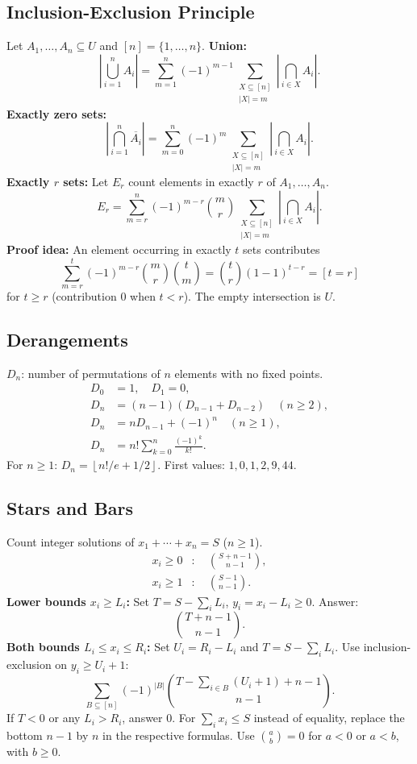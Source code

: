 \documentclass[portrait, 8pt, a4paper, oneside, twocolumn]{extarticle}
\begin{document}
\subsection{Inclusion-Exclusion Principle}
Let $A_1,\ldots,A_n\subseteq U$ and $[n]=\{1,\ldots,n\}$.
\textbf{Union:}
\[
\left|\bigcup_{i=1}^{n}A_i\right|
=\sum_{m=1}^{n}(-1)^{m-1}
\sum_{\substack{X\subseteq[n]\\|X|=m}}
\left|\bigcap_{i\in X}A_i\right|.
\]
\textbf{Exactly zero sets:}
\[
\left|\bigcap_{i=1}^{n}\overline{A_i}\right|
=\sum_{m=0}^{n}(-1)^m
\sum_{\substack{X\subseteq[n]\\|X|=m}}
\left|\bigcap_{i\in X}A_i\right|.
\]
\textbf{Exactly $r$ sets:} Let $E_r$ count elements in exactly $r$ of $A_1,\ldots,A_n$.
\[
\boxed{E_r=\sum_{m=r}^{n}(-1)^{m-r}\binom{m}{r}
\sum_{\substack{X\subseteq[n]\\|X|=m}}
\left|\bigcap_{i\in X}A_i\right|.}
\]
\textbf{Proof idea:} An element occurring in exactly $t$ sets contributes
\[
\sum_{m=r}^{t}(-1)^{m-r}\binom{m}{r}\binom{t}{m}
=\binom{t}{r}(1-1)^{t-r}=[t=r]
\]
for $t\ge r$ (contribution $0$ when $t<r$).
The empty intersection is $U$.

\subsection{Derangements}
$D_n$: number of permutations of $n$ elements with no fixed points.
\begin{align*}
D_0&=1,\quad D_1=0,\\
D_n&=(n-1)(D_{n-1}+D_{n-2})\quad(n\ge2),\\
D_n&=nD_{n-1}+(-1)^n\quad(n\ge1),\\
D_n&=n!\sum_{k=0}^{n}\frac{(-1)^k}{k!}.
\end{align*}
For $n\ge1$: $D_n=\left\lfloor n!/e+1/2\right\rfloor$.
First values: $1,0,1,2,9,44$.

\subsection{Stars and Bars}
Count integer solutions of $x_1+\cdots+x_n=S$ ($n\ge1$).
\begin{align*}
x_i\ge0 &: \quad \binom{S+n-1}{n-1},\\
x_i\ge1 &: \quad \binom{S-1}{n-1}.
\end{align*}
\textbf{Lower bounds $x_i\ge L_i$:}
Set $T=S-\sum_iL_i$, $y_i=x_i-L_i\ge0$. Answer:
\[
\binom{T+n-1}{n-1}.
\]
\textbf{Both bounds $L_i\le x_i\le R_i$:}
Set $U_i=R_i-L_i$ and $T=S-\sum_iL_i$.
Use inclusion-exclusion on $y_i\ge U_i+1$:
\[
\boxed{\sum_{B\subseteq[n]}(-1)^{|B|}
\binom{T-\sum_{i\in B}(U_i+1)+n-1}{n-1}.}
\]
If $T<0$ or any $L_i>R_i$, answer $0$.
For $\sum_i x_i\le S$ instead of equality, replace the bottom $n-1$ by $n$ in the respective formulas.
Use $\binom{a}{b}=0$ for $a<0$ or $a<b$, with $b\ge0$.
\end{document}
